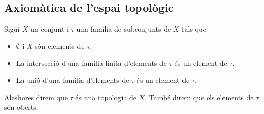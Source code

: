 \documentclass[../Apunts.tex]{subfiles}
\begin{document}
	\subsection{Axiomàtica de l'espai topològic}
	\begin{definition}[Topologia]	%
		\label{def:topologia}
		\label{def:oberts topologia}
		Sigui \(X\) un conjunt i \(\tau\) una família de subconjunts de \(X\) tals que
		\begin{itemize}
		\item \(\emptyset\) i \(X\) són elements de \(\tau\).
		\item La intersecció d'una família finita d'elements de \(\tau\) és un element de \(\tau\).
		\item La unió d'una família d'elements de \(\tau\) és un element de \(\tau\).
		\end{itemize}
		Aleshores direm que \(\tau\) és una topologia de \(X\). També direm que els elements de \(\tau\) són oberts.
	\end{definition}
\end{document}
